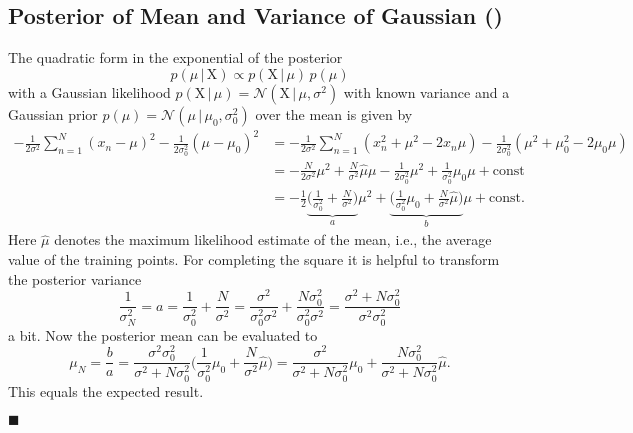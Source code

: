 \documentclass[11pt, a4paper]{scrartcl}
\newcommand{\mat}[1]{\bm{\mathrm{#1}}}
\newcommand{\given}{\,\vert\,}
\newcommand{\eot}{\hfill\(\blacksquare\)}
\newcommand{\diffstar}{\texorpdfstring{\raisebox{-1pt}{\resizebox{!}{8pt}{\(\star\)}}}{*}}
\newcommand{\onestar}  {(\diffstar)}
\begin{document}
		\subsection{Posterior of Mean and Variance of Gaussian  \onestar}
			The quadratic form in the exponential of the posterior
			\begin{equation}
				p(\mu \given \mat{X}) \propto p(\mat{X} \given \mu) \, p(\mu)
			\end{equation}
			with a Gaussian likelihood \( p(\mat{X} \given \mu) = \mathcal{N}(\mat{X} \given \mu, \sigma^2) \) with known variance and a Gaussian prior \( p(\mu) = \mathcal{N}(\mu \given \mu_0, \sigma_0^2) \) over the mean is given by
			\begin{align}
				-\frac{1}{2 \sigma^2} \sum_{n = 1}^{N} (x_n - \mu)^2 - \frac{1}{2 \sigma_0^2} (\mu - \mu_0)^2
					&= -\frac{1}{2 \sigma^2} \sum_{n = 1}^{N} (x_n^2 + \mu^2 - 2 x_n \mu) - \frac{1}{2 \sigma_0^2} (\mu^2 + \mu_0^2 - 2 \mu_0 \mu) \\
					&= -\frac{N}{2 \sigma^2} \mu^2 + \frac{N}{\sigma^2} \hat{\mu} \mu - \frac{1}{2 \sigma_0^2} \mu^2 + \frac{1}{\sigma_0^2} \mu_0 \mu + \mathrm{const} \\
					&= -\frac{1}{2} \underbrace{\bigg( \frac{1}{\sigma_0^2} + \frac{N}{\sigma^2} \bigg)}_{a} \mu^2 + \underbrace{\bigg( \frac{1}{\sigma_0^2} \mu_0 + \frac{N}{\sigma^2} \hat{\mu} \bigg)}_{b} \mu + \mathrm{const}.
			\end{align}
			Here \( \hat{\mu} \) denotes the maximum likelihood estimate of the mean, i.e., the average value of the training points. For completing the square it is helpful to transform the posterior variance
			\begin{equation}
				\frac{1}{\sigma_N^2}
					= a
					= \frac{1}{\sigma_0^2} + \frac{N}{\sigma^2}
					= \frac{\sigma^2}{\sigma_0^2 \sigma^2} + \frac{N \sigma_0^2}{\sigma_0^2 \sigma^2}
					= \frac{\sigma^2 + N \sigma_0^2}{\sigma^2 \sigma_0^2}
			\end{equation}
			a bit. Now the posterior mean can be evaluated to
			\begin{equation}
				\mu_N
					= \frac{b}{a}
					= \frac{\sigma^2 \sigma_0^2}{\sigma^2 + N \sigma_0^2} \bigg( \frac{1}{\sigma_0^2} \mu_0 + \frac{N}{\sigma^2} \hat{\mu} \bigg)
					= \frac{\sigma^2}{\sigma^2 + N \sigma_0^2} \mu_0 + \frac{N \sigma_0^2}{\sigma^2 + N \sigma_0^2} \hat{\mu}.
			\end{equation}
			This equals the expected result.

			\eot
\end{document}
